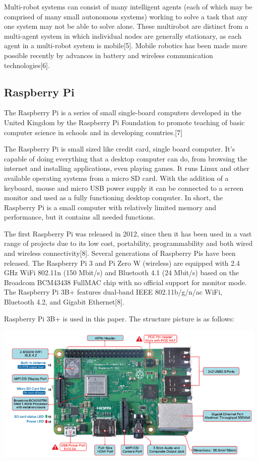 \documentclass{mproj}
\begin{document}
Multi-robot systems can consist of many intelligent agents (each of which may be comprised of many small autonomous systems) working to solve a task that any one system may not be able to solve alone. These multirobot are distinct from a multi-agent system in which individual nodes are generally stationary, as each agent in a multi-robot system is mobile[5]. Mobile robotics has been made more possible recently by advances in battery and wireless communication technologies[6].

\subsection{Raspberry Pi}
The Raspberry Pi is a series of small single-board computers developed in the United Kingdom by the Raspberry Pi Foundation to promote teaching of basic computer science in schools and in developing countries.[7]

The Raspberry Pi is small sized like credit card, single board computer. It’s capable of doing everything that a desktop computer can do, from browsing the internet and installing applications, even playing games. It runs Linux and other available operating systems from a micro SD card. With the addition of a keyboard, mouse and micro USB power supply it can be connected to a screen monitor and used as a fully functioning desktop computer. In short, the Raspberry Pi is a small computer with relatively limited memory and performance, but it contains all needed functions.  

The first Raspberry Pi was released in 2012, since then it has been used in a vast range of projects due to its low cost, portability, programmability and both wired and wireless connectivity[8]. Several generations of Raspberry Pis have been released. The Raspberry Pi 3 and Pi Zero W (wireless) are equipped with 2.4 GHz WiFi 802.11n (150 Mbit/s) and Bluetooth 4.1 (24 Mbit/s) based on the Broadcom BCM43438 FullMAC chip with no official support for monitor mode. The Raspberry Pi 3B+ features dual-band IEEE 802.11b/g/n/ac WiFi, Bluetooth 4.2, and Gigabit Ethernet[8].

Raspberry Pi 3B+ is used in this paper. The structure picture is as follows:

\includegraphics[width = .9\textwidth]{212.png}
\end{document}
